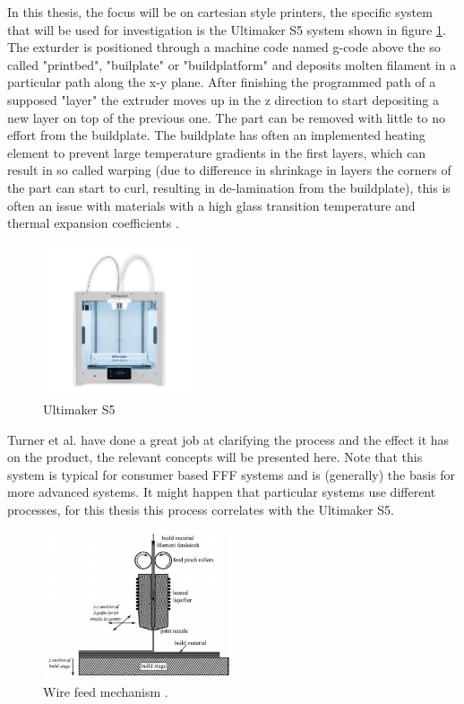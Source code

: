 In this thesis, the focus will be on cartesian style printers, the specific system that will be used for investigation is the Ultimaker S5 system \cite{UltimakerUltimakerSheet} shown in figure \ref{fig:UltimakerS5}. The exturder is positioned through a machine code named g-code above the so called "printbed", "builplate" or "buildplatform" and deposits molten filament in a particular path along the x-y plane. After finishing the programmed path of a supposed "layer" the extruder moves up in the z direction to start depositing a new layer on top of the previous one. The part can be removed with little to no effort from the buildplate. The buildplate has often an implemented heating element to prevent large temperature gradients in the first layers, which can result in so called warping (due to difference in shrinkage in layers the corners of the part can start to curl, resulting in de-lamination from the buildplate), this is often an issue with materials with a high glass transition temperature and thermal expansion coefficients \cite{Turner2014AModeling}. 

\begin{figure}[H]
    \centering
    \includegraphics[width=0.40\textwidth]{chapter_2/figures/UltimakerS5.png}
    \caption{Ultimaker S5 \cite{UltimakerUltimakerSheet}}
    \label{fig:UltimakerS5}
\end{figure}

 Turner et al.\cite{Turner2014AModeling} have done a great job at clarifying the process and the effect it has on the product, the relevant concepts will be presented here. Note that this system is typical for consumer based FFF systems and is (generally) the basis for more advanced systems. It might happen that particular systems use different processes, for this thesis this process correlates with the Ultimaker S5. 

\begin{figure}[H]
    \centering
    \includegraphics[width=0.50\textwidth]{chapter_2/figures/Wirefeedmechanism.PNG}
    \caption{Wire feed mechanism \cite{Turner2014AModeling}.}
    \label{fig:Wirefeed}
\end{figure}

